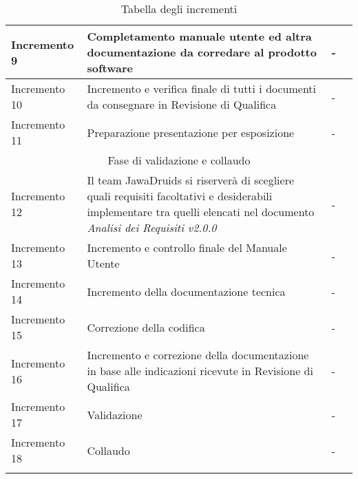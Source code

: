 \begin{center}
\begin{longtable}[c]{p{3cm}|p{5cm}|p{4cm}|p{3cm}}
		\hline
		\centering Incremento 9 & \centering Completamento manuale utente ed altra documentazione da corredare al prodotto software & \centering - & \makecell[tc]{-} \\
		\hline
		\centering Incremento 10 & \centering Incremento e verifica finale di tutti i documenti da consegnare in Revisione di Qualifica & \centering - & \makecell[tc]{-} \\
		\hline
		\centering Incremento 11 & \centering Preparazione presentazione per esposizione & \centering - & \makecell[tc]{-} \\
		\hline
		\multicolumn{4}{|c|}{Fase di validazione e collaudo}\\
		\hline
		\centering Incremento 12 & \centering Il team JawaDruids si riserverà di scegliere quali requisiti facoltativi e desiderabili implementare tra quelli elencati nel documento \textit{Analisi dei Requisiti v2.0.0}  & \centering - & \makecell[tc]{-} \\
		\hline
		\centering Incremento 13 & \centering Incremento e controllo finale del Manuale Utente   & \centering - & \makecell[tc]{-} \\
		\hline
		\centering Incremento 14 & \centering Incremento della documentazione tecnica & \centering - & \makecell[tc]{-} \\
		\hline
		\centering Incremento 15 & \centering Correzione della codifica  & \centering - & \makecell[tc]{-} \\
		\hline
		\centering Incremento 16 & \centering Incremento e correzione della documentazione in base alle indicazioni ricevute in Revisione di Qualifica & \centering - & \makecell[tc]{-} \\
		\hline
		\centering Incremento 17 & \centering Validazione & \centering - & \makecell[tc]{-} \\
		\hline
		\centering Incremento 18 & \centering Collaudo & \centering - & \makecell[tc]{-} \\
		\hline
		\rowcolor{white}
		\caption[\textbf{Tabella degli incrementi}]{Tabella degli incrementi}\label{qua va in base alle label di altre tabelle mi sa}
	\end{longtable}
\end{center}
